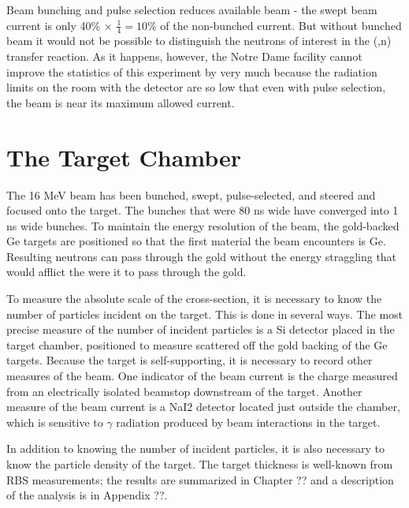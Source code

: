 
Beam bunching and pulse selection reduces available beam - the swept beam current is only 40\% $\times$ $\frac{1}{4} = 10$\% of the non-bunched current.  But without bunched beam it would not be possible to distinguish the neutrons of interest in the (,n) transfer reaction.  As it happens, however, the Notre Dame facility cannot improve the statistics of this experiment by very much because the radiation limits on the room with the detector are so low that even with pulse selection, the beam is near its maximum allowed current.

\section{The Target Chamber}

The 16 MeV  beam has been bunched, swept, pulse-selected, and steered and focused onto the target.  The bunches that were 80 ns wide have converged into 1 ns wide bunches.  To maintain the energy resolution of the beam, the gold-backed Ge targets are positioned so that the first material the beam encounters is Ge.  Resulting neutrons can pass through the gold without the energy straggling that would afflict the  were it to pass through the gold.  

To measure the absolute scale of the cross-section, it is necessary to know the number of particles incident on the target.  This is done in several ways.  The most precise measure of the number of incident particles is a Si detector placed in the target chamber, positioned to measure  scattered off the gold backing of the Ge targets.  Because the  target is self-supporting, it is necessary to record other measures of the beam.  One indicator of the beam current is the charge measured from an electrically isolated beamstop downstream of the target.  Another measure of the beam current is a NaI2 detector located just outside the chamber, which is sensitive to $\gamma$ radiation produced by beam interactions in the target.  

In addition to knowing the number of incident particles, it is also necessary to know the particle density of the target.  The target thickness is well-known from RBS measurements; the results are summarized in Chapter ?? and a description of the analysis is in Appendix ??.  


